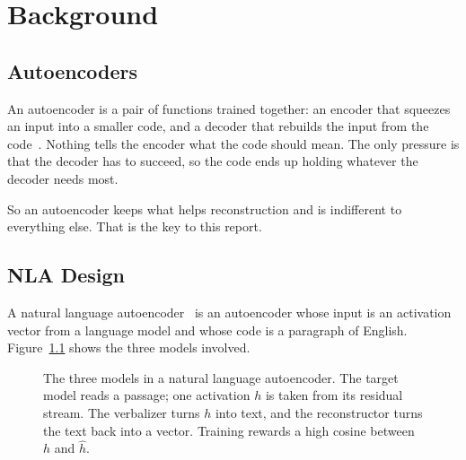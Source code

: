 \chapter{Background}
\label{ch:background}

\section{Autoencoders}

An autoencoder is a pair of functions trained together: an encoder that squeezes an input into a smaller
code, and a decoder that rebuilds the input from the code~\cite{hinton2006reducing}. Nothing tells the
encoder what the code should mean. The only pressure is that the decoder has to succeed, so the code ends up
holding whatever the decoder needs most.

So an autoencoder keeps what helps reconstruction and is indifferent to everything else. That is the key to
this report.

\section{NLA Design}

A natural language autoencoder~\cite{frasertaliente2026nla} is an autoencoder whose input is an activation
vector from a language model and whose code is a paragraph of English. Figure~\ref{fig:nla} shows the three
models involved.

\begin{figure}[t]
\centering
{}
\caption[The three models in a natural language autoencoder]{The three models in a natural language
autoencoder. The target model reads a passage; one activation $h$ is taken from its residual stream. The
verbalizer turns $h$ into text, and the reconstructor turns the text back into a vector. Training rewards a
high cosine between $h$ and $\hat h$.}
\label{fig:nla}
\end{figure}

